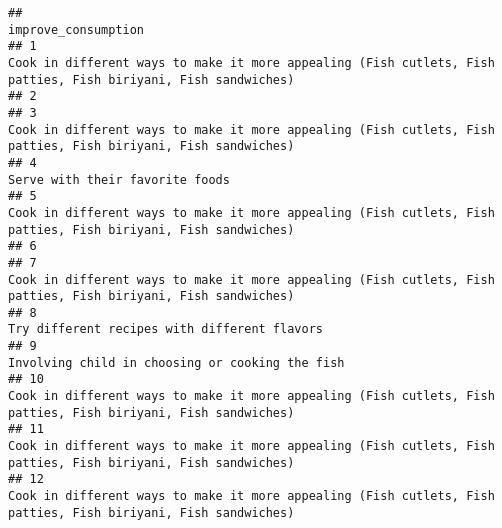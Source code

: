 \documentclass[
]{article}
\begin{document}
\begin{verbatim}
##                                                                                                                                                                                              improve_consumption
## 1                                                                                                  Cook in different ways to make it more appealing (Fish cutlets, Fish patties, Fish biriyani, Fish sandwiches)
## 2                                                                                                                                                                                                               
## 3                                                                                                  Cook in different ways to make it more appealing (Fish cutlets, Fish patties, Fish biriyani, Fish sandwiches)
## 4                                                                                                                                                                                Serve with their favorite foods
## 5                                                                                                  Cook in different ways to make it more appealing (Fish cutlets, Fish patties, Fish biriyani, Fish sandwiches)
## 6                                                                                                                                                                                                               
## 7                                                                                                  Cook in different ways to make it more appealing (Fish cutlets, Fish patties, Fish biriyani, Fish sandwiches)
## 8                                                                                                                                                                   Try different recipes with different flavors
## 9                                                                                                                                                                Involving child in choosing or cooking the fish
## 10                                                                                                 Cook in different ways to make it more appealing (Fish cutlets, Fish patties, Fish biriyani, Fish sandwiches)
## 11                                                                                                 Cook in different ways to make it more appealing (Fish cutlets, Fish patties, Fish biriyani, Fish sandwiches)
## 12                                                                                                 Cook in different ways to make it more appealing (Fish cutlets, Fish patties, Fish biriyani, Fish sandwiches)

\end{verbatim}
\end{document}
